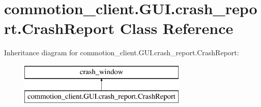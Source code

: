 \hypertarget{classcommotion__client_1_1GUI_1_1crash__report_1_1CrashReport}{\section{commotion\-\_\-client.\-G\-U\-I.\-crash\-\_\-report.\-Crash\-Report Class Reference}
\label{classcommotion__client_1_1GUI_1_1crash__report_1_1CrashReport}
}
Inheritance diagram for commotion\-\_\-client.\-G\-U\-I.\-crash\-\_\-report.\-Crash\-Report\-:\begin{figure}[H]
\begin{center}
\leavevmode
\includegraphics[height=2.000000cm]{classcommotion__client_1_1GUI_1_1crash__report_1_1CrashReport}
\end{center}
\end{figure}
